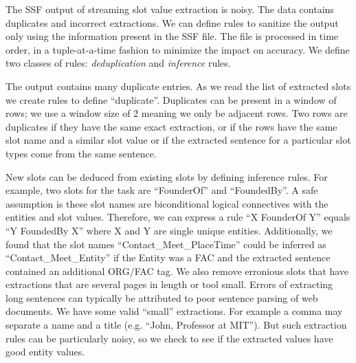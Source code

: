 The SSF output of streaming slot value extraction is noisy. The data contains duplicates and incorrect extractions. We can define rules to sanitize the output only using the information present in the SSF file. The file is processed in time order, in a tuple-at-a-time fashion to minimize the impact on accuracy. We define two classes of rules: \textit{deduplication} and \textit{inference} rules.

The output contains many duplicate entries. As we read the list of extracted slots we create rules to define ``duplicate''. Duplicates can be present in a window of rows; we use a window size of 2 meaning we only be adjacent rows. Two rows are duplicates if they have the same exact extraction, or if the rows have the same slot name and a similar slot value or if the extracted sentence for a particular slot types come from the same sentence.

 New slots can be deduced from existing slots by defining inference rules. For example, two slots for the task are ``FounderOf'' and ``FoundedBy''. A safe assumption is these slot names are biconditional logical connectives with the entities and slot values. Therefore, we can express a rule ``X FounderOf Y'' equals ``Y FoundedBy X'' where X and Y are single unique entities. Additionally, we found that the slot names ``Contact\_Meet\_PlaceTime'' could be inferred as ``Contact\_Meet\_Entity'' if the Entity was a FAC and the extracted sentence contained an additional ORG/FAC tag. We also remove erronious slots that have extractions that are several pages in length or tool small. Errors of extracting long sentences can typically be 
attributed to poor sentence parsing of web documents. We have some valid ``small'' extractions. For example a comma may separate a name and a title (e.g. ``John, Professor at MIT''). But such extraction rules can be particularly noisy, so we check to see if the extracted values have good entity values.




